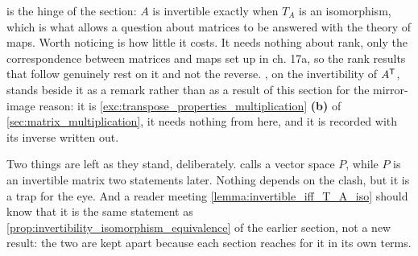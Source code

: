 \begin{ainote}
 is the hinge of the section: $A$ is
invertible exactly when $T_A$ is an isomorphism, which is what allows a question
about matrices to be answered with the theory of maps. Worth noticing is how
little it costs. It needs nothing about rank, only the correspondence between
matrices and maps set up in ch. 17a, so the rank results that follow genuinely
rest on it and not the reverse. , on the
invertibility of $A^{\mathsf{T}}$, stands beside it as a remark rather than as a
result of this section for the mirror-image reason: it is
\cref{exc:transpose_properties_multiplication} \textbf{(b)} of
\cref{sec:matrix_multiplication}, it needs nothing from here, and it is recorded
with its inverse written out.

Two things are left as they stand, deliberately.
 calls a vector space $P$, while $P$ is
an invertible matrix two statements later. Nothing depends on the clash, but it
is a trap for the eye. And a reader meeting
\cref{lemma:invertible_iff_T_A_iso} should know that it is the same statement as
\cref{prop:invertibility_isomorphism_equivalence} of the earlier section, not a
new result: the two are kept apart because each section reaches for it in its
own terms.
\end{ainote}
